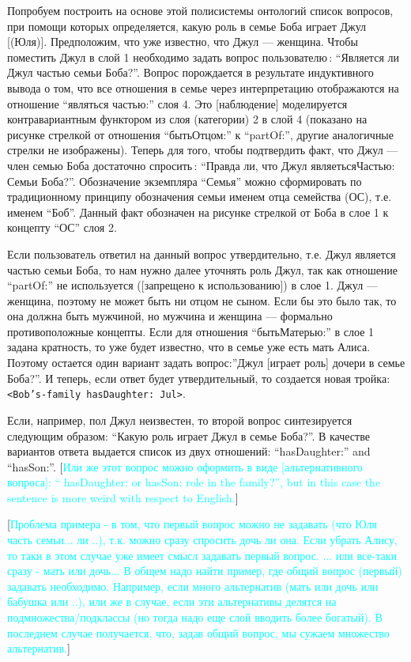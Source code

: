\documentclass[utf8]{../IncArticle}
\newcommand{\e}[2][fcolor]{\textcolor{pcolor}{[}\textcolor{#1}{#2}\textcolor{pcolor}{]}}
\begin{document}
Попробуем построить на основе этой полисистемы онтологий список
вопросов, при помощи которых определяется, какую роль в семье Боба
играет Джул \e{(Юля)}.  Предположим, что уже известно, что Джул ---
женщина.  Чтобы поместить Джул в слой 1 необходимо задать вопрос
пользователю\,: ``Является ли Джул частью семьи Боба?''.  Вопрос
порождается в результате индуктивного вывода о том, что все отношения
в семье через интерпретацию отображаются на отношение ``являться
частью:'' слоя 4.  Это \e{наблюдение} моделируется контравариантным
функтором из слоя (категории) 2 в слой 4 (показано на рисунке
стрелкой от отношения ``бытьОтцом:'' к ``partOf:'', другие аналогичные
стрелки не изображены).  Теперь для того, чтобы подтвердить факт, что
Джул --- член семью Боба достаточно спросить\,: ``Правда ли, что Джул
являетьсяЧастью: Семьи Боба?''.  Обозначение экземпляра ``Семья''
можно сформировать по традиционному принципу обозначения семьи именем
отца семейства (ОС), т.е. именем ``Боб''.  Данный факт обозначен на
рисунке стрелкой от Боба в слое 1 к концепту ``ОС'' слоя 2.

Если пользователь ответил на данный вопрос утвердительно, т.е. Джул
является частью семьи Боба, то нам нужно далее уточнять роль Джул, так
как отношение ``partOf:'' не используется (\e{запрещено к
  использованию}) в слое 1.  Джул --- женщина, поэтому не может быть
ни отцом не сыном. Если бы это было так, то она должна быть мужчиной,
но мужчина и женщина --- формально противоположные концепты.  Если для
отношения ``бытьМатерью:'' в слое 1 задана кратность, то уже будет
известно, что в семье уже есть мать Алиса.  Поэтому остается один
вариант задать вопрос:''Джул [играет роль] дочери в семье Боба?''.  И
теперь, если ответ будет утвердительный, то создается новая тройка: \texttt{<Bob's-family hasDaughter: Jul>}.

Если, например, пол Джул неизвестен, то второй вопрос синтезируется
следующим образом: ``Какую роль играет Джул в семье Боба?''.  В
качестве вариантов ответа выдается список из двух отношений:
``hasDaughter:'' and ``hasSon:''.  \e[cyan]{Или же этот вопрос можно оформить в
виде \e{альтернативного вопроса}: `` hasDaughter: or hasSon: role in the family?'', but in this case the sentence is more weird with respect to English.}

\e[cyan]{Проблема примера - в том, что первый вопрос можно не
  задавать (что Юля часть семьи... ли ..), т.к. можно сразу спросить
  дочь ли она. Если убрать Алису, то таки в этом случае уже имеет
  смысл задавать первый вопрос. ... или все-таки сразу - мать или
  дочь... В общем надо найти пример, где общий вопрос (первый)
  задавать необходимо. Например, если много альтернатив (мать или дочь
  или бабушка или ..), или же в случае, если эти альтернативы делятся
  на подмножества/подклассы (но тогда надо еще слой вводить более
  богатый). В последнем случае получается, что, задав общий вопрос, мы
  сужаем множество альтернатив.}
\end{document}
